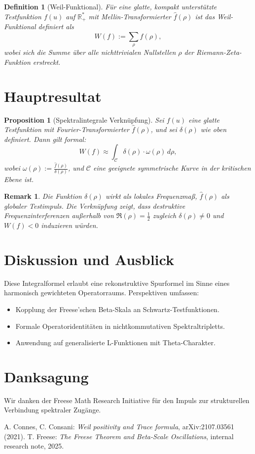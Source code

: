 \documentclass[11pt]{article}
\newtheorem{definition}{Definition}
\newtheorem{proposition}{Proposition}
\newtheorem{remark}{Remark}
\begin{document}
\begin{definition}[Weil-Funktional]
Für eine glatte, kompakt unterstützte Testfunktion \(f(u)\) auf \(\mathbb{R}_+^*\) mit Mellin-Transformierter \(\hat{f}(\rho)\) ist das Weil-Funktional definiert als
\[
W(f) := \sum_\rho \hat{f}(\rho),
\]
wobei sich die Summe über alle nichttrivialen Nullstellen \(\rho\) der Riemann-Zeta-Funktion erstreckt.
\end{definition}

\section{Hauptresultat}

\begin{proposition}[Spektralintegrale Verknüpfung]
Sei \(f(u)\) eine glatte Testfunktion mit Fourier-Transformierter \(\hat{f}(\rho)\), und sei \(\delta(\rho)\) wie oben definiert. Dann gilt formal:
\[
W(f) \approx \int_{\mathcal{C}} \delta(\rho) \cdot \omega(\rho) \, d\rho,
\]
wobei \(\omega(\rho) := \frac{\hat{f}(\rho)}{\delta(\rho)}\), und \(\mathcal{C}\) eine geeignete symmetrische Kurve in der kritischen Ebene ist.
\end{proposition}

\begin{remark}
Die Funktion \(\delta(\rho)\) wirkt als lokales Frequenzmaß, \(\hat{f}(\rho)\) als globaler Testimpuls. Die Verknüpfung zeigt, dass destruktive Frequenzinterferenzen außerhalb von \(\Re(\rho) = \tfrac{1}{2}\) zugleich \(\delta(\rho) \neq 0\) und \(W(f) < 0\) induzieren würden.
\end{remark}

\section{Diskussion und Ausblick}

Diese Integralformel erlaubt eine rekonstruktive Spurformel im Sinne eines harmonisch gewichteten Operatorraums. Perspektiven umfassen:

\begin{itemize}[topsep=3pt]
    \item Kopplung der Freese’schen Beta-Skala an Schwartz-Testfunktionen.
    \item Formale Operatoridentitäten in nichtkommutativen Spektraltripletts.
    \item Anwendung auf generalisierte L-Funktionen mit Theta-Charakter.
\end{itemize}

\section*{Danksagung}

Wir danken der Freese Math Research Initiative für den Impuls zur strukturellen Verbindung spektraler Zugänge.


\begin{thebibliography}{9}
 A. Connes, C. Consani: \textit{Weil positivity and Trace formula}, arXiv:2107.03561 (2021).
 T. Freese: \textit{The Freese Theorem and Beta-Scale Oscillations}, internal research note, 2025.
\end{thebibliography}
\end{document}
